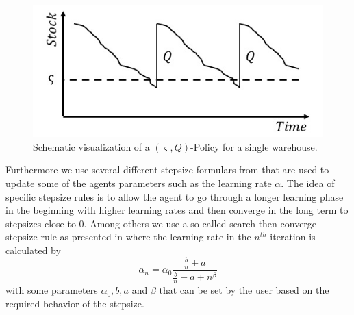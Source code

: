 \documentclass[journal, a4paper]{IEEEtran}
\theoremstyle{plain}
\theoremstyle{definition}
\begin{document}
\begin{figure}[h]
	\centering
	\includegraphics[width=0.8\columnwidth]{sQ.jpg}
	\caption{\label{sQ} Schematic visualization of a $(\varsigma, Q)$-Policy for a single warehouse.}
\end{figure}
\newline
Furthermore we use several different stepsize formulars from \cite{PowellADP} that are used to update some of the agents parameters such as the learning rate $\alpha$. The idea of specific stepsize rules is to allow the agent to go through a longer learning phase in the beginning with higher learning rates and then converge in the long term to stepsizes close to $0$. %
Among others we use a so called search-then-converge stepsize rule as presented in \cite{PowellADP} where the learning rate in the $n^{th}$ iteration is calculated by
\begin{equation}
\label{eq:stc}
	\alpha_n = \alpha_0 \frac{\frac{b}{n} + a}{ \frac{b}{n} + a + n^{\beta}}
\end{equation}
with some parameters $\alpha_0, b, a$ and $\beta$ that can be set by the user based on the required behavior of the stepsize. %
\end{document}

